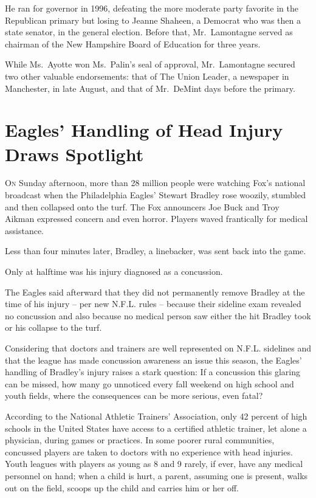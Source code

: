 ﻿\documentclass[12pt]{article}
\begin{document}
He ran for governor in 1996, defeating the more moderate party favorite in the Republican primary
but losing to Jeanne Shaheen, a Democrat who was then a state senator, in the general election.
Before that, Mr.~Lamontagne served as chairman of the New Hampshire Board of Education for three
years.

While Ms.~Ayotte won Ms.~Palin's seal of approval, Mr.~Lamontagne secured two other valuable
endorsements: that of The Union Leader, a newspaper in Manchester, in late August, and that of
Mr.~DeMint days before the primary.

\pagebreak
\section{Eagles' Handling of Head Injury Draws Spotlight}

\lettrine{O}{n} Sunday afternoon, more than 28 million people were watching
Fox's national broadcast when the Philadelphia Eagles' Stewart Bradley rose woozily, stumbled and
then collapsed onto the turf. The Fox announcers Joe Buck and Troy Aikman expressed concern and even
horror. Players waved frantically for medical assistance.

Less than four minutes later, Bradley, a linebacker, was sent back into the game.

Only at halftime was his injury diagnosed as a concussion.

The Eagles said afterward that they did not permanently remove Bradley at the time of his injury --
per new N.F.L. rules -- because their sideline exam revealed no concussion and also because no
medical person saw either the hit Bradley took or his collapse to the turf.

Considering that doctors and trainers are well represented on N.F.L. sidelines and that the league
has made concussion awareness an issue this season, the Eagles' handling of Bradley's injury raises
a stark question: If a concussion this glaring can be missed, how many go unnoticed every fall
weekend on high school and youth fields, where the consequences can be more serious, even fatal?

According to the National Athletic Trainers' Association, only 42 percent of high schools in the
United States have access to a certified athletic trainer, let alone a physician, during games or
practices. In some poorer rural communities, concussed players are taken to doctors with no
experience with head injuries. Youth leagues with players as young as 8 and 9 rarely, if ever, have
any medical personnel on hand; when a child is hurt, a parent, assuming one is present, walks out on
the field, scoops up the child and carries him or her off.
\end{document}
